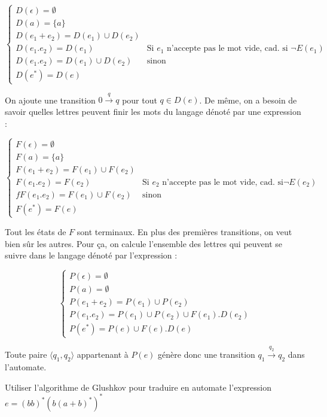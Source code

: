 \[
\begin{cases}
D(\epsilon) = \emptyset \\
D(a) = \{a\} \\
D(e_1+e_2) = D(e_1) \cup D(e_2) \\
D(e_1.e_2) = D(e_1) & \text{Si } e_1 \text{ n'accepte pas le mot vide, cad. si }\neg E(e_1)\\
D(e_1.e_2) = D(e_1) \cup D(e_2) & \text{sinon}  \\
D(e^*) = D(e)
\end{cases}
\]

On ajoute une transition $0 \xrightarrow{q} q$ pour tout $q \in D(e)$. De même, on a besoin de savoir quelles lettres peuvent finir les mots du langage dénoté par une expression : 

\[
\begin{cases}
F(\epsilon) = \emptyset \\
F(a) = \{a\} \\
F(e_1+e_2) = F(e_1) \cup F(e_2) \\
F(e_1.e_2) = F(e_2) & \text{Si } e_2 \text{ n'accepte pas le mot vide, cad. si} \neg E(e_2)\\f
F(e_1.e_2) = F(e_1) \cup F(e_2) & \text{sinon}  \\
F(e^*) = F(e)
\end{cases}
\]


Tout les états de $F$ sont terminaux. En plus des premières transitions, on veut bien sûr les autres. Pour ça, on calcule l'ensemble des lettres qui peuvent se suivre dans le langage dénoté par l'expression :

\[
\begin{cases}
P(\epsilon) = \emptyset \\
P(a) = \emptyset \\
P(e_1+e_2) = P(e_1) \cup P(e_2) \\
P(e_1.e_2) = P(e_1) \cup P(e_2) \cup F(e_1).D(e_2) \\
P(e^*) = P(e) \cup F(e).D(e) 
\end{cases}
\]

Toute paire $\big \langle q_1, q_2 \big \rangle$ appartenant à $P(e)$ génère donc une transition $q_1 \xrightarrow{q_2} q_2$ dans l'automate.


\begin{exercice}
Utiliser l'algorithme de Glushkov pour traduire en automate l'expression \newline $e = (bb)^*(b(a+b)^*)^*$
\end{exercice}

